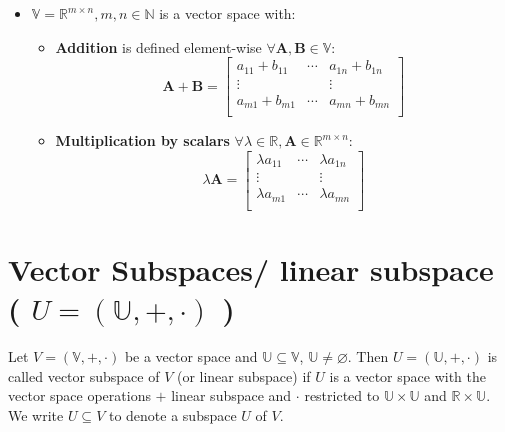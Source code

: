\begin{itemize}
\begin{itemize}
    \end{itemize}

    \item $\mathbb{V} = \mathbb{R}^{m\times n}, m, n \in \mathbb{N}$ is a vector space with:
    \begin{itemize}
        \item \textbf{Addition} is defined element-wise $\forall \mathbf{A, B} \in \mathbb{V}$: 
        \[
            \mathbf{A + B} = \begin{bmatrix}
                a_{11} + b_{11} & \cdots & a_{1n} + b_{1n} \\
                \vdots & & \vdots \\
                a_{m1} + b_{m1} & \cdots & a_{mn} + b_{mn} \\
            \end{bmatrix}
        \]

        \item \textbf{Multiplication by scalars} $\forall \lambda\in\mathbb{R}, \mathbf{A}\in\mathbb{R}^{m\times n}$:
        \[
            \lambda\mathbf{A} = \begin{bmatrix}
                \lambda a_{11} & \cdots & \lambda a_{1n} \\
                \vdots & & \vdots \\
                \lambda a_{m1} & \cdots & \lambda a_{mn} \\
            \end{bmatrix}
        \]
    \end{itemize}


\end{itemize}













\section{Vector Subspaces/ linear subspace ( $U = (\mathbb{U}, +, \cdot)$ ) \cite{mfml-1}}\label{Vector Subspaces/ linear subspace}
Let $V = (\mathbb{V}, +, \cdot)$ be a vector space and $\mathbb{U} \subseteq \mathbb{V}$, $\mathbb{U} \neq \varnothing$. Then $U = (\mathbb{U}, +, \cdot)$ is called vector subspace of $V$ (or linear subspace) if $U$ is a vector space with the vector space operations $+$ linear subspace and $\cdot$ restricted to $\mathbb{U} \times \mathbb{U}$ and $\mathbb{R} \times \mathbb{U}$. We write $U \subseteq V$ to denote a subspace $U$ of $V$.

